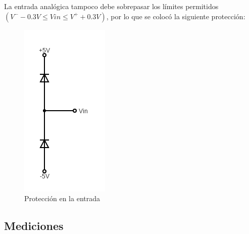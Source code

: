 \documentclass[assd_tp3_main.tex]{subfiles}
\begin{document}
La entrada analógica tampoco debe sobrepasar los límites permitidos
$(V^- - 0.3V \leq Vin \leq V^+ + 0.3V )$, por lo que se colocó la siguiente protección:

\begin{figure}[H]
	\centering
	\includegraphics[width=0.2 \textwidth]
	{images/ej1/proteccion in.png}
	\caption{Protección en la entrada}
	\label{fig:pin}
\end{figure}




\subsection{Mediciones}
\end{document}
